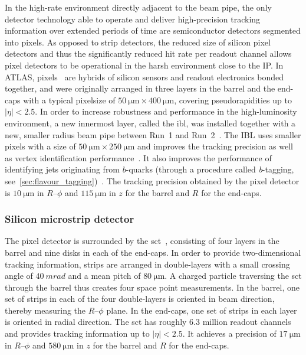 In the high-rate environment directly adjacent to the beam pipe, the only detector technology able to operate and deliver high-precision tracking information over extended periods of time are semiconductor detectors segmented into pixels. As opposed to strip detectors, the reduced size of silicon pixel detectors and thus the significantly reduced hit rate per readout channel allows pixel detectors to be operational in the harsh environment close to the IP.
In ATLAS, pixels~\cite{Aad:2008zzm} are hybrids of silicon sensors and readout electronics bonded together, and were originally arranged in three layers in the barrel and the end-caps with a typical pixelsize of $\SI{50}{\micro\meter}\times \SI{400}{\micro\meter}$, covering pseudorapidities up to $\vert\eta\vert < 2.5$.
In order to increase robustness and performance in the high-luminosity environment, a new innermost layer, called the \gls{ibl}, was installed together with a new, smaller radius beam pipe between Run~1 and Run~2~\cite{Abbott:2018ikt,Capeans:1291633}.
The IBL uses smaller pixels with a size of $\SI{50}{\micro\meter}\times \SI{250}{\micro\meter}$ and improves the tracking precision as well as vertex identification performance~\cite{Capeans:1291633}. It also improves the performance of identifying jets originating from $b$-quarks (through a procedure called \textit{b}-tagging, see~\cref{sec:flavour_tagging})~\cite{Aad:2019aic}. The tracking precision obtained by the pixel detector is $\SI{10}{\micro\meter}$ in $R$--$\phi$ and $\SI{115}{\micro\meter}$ in $z$ for the barrel and $R$ for the end-caps.

\subsubsection{Silicon microstrip detector}

The pixel detector is surrounded by the \gls{sct}~\cite{Aad:2008zzm}, consisting of four layers in the barrel and nine disks in each of the end-caps. In order to provide two-dimensional tracking information, strips are arranged in double-layers with a small crossing angle of $\SI{40}{mrad}$ and a mean pitch of $\SI{80}{\micro\meter}$.
A charged particle traversing the \gls{sct} through the barrel thus creates four space point measurements.
In the barrel, one set of strips in each of the four double-layers is oriented in beam direction, thereby measuring the $R$--$\phi$ plane. In the end-caps, one set of strips in each layer is oriented in radial direction.
The \gls{sct} has roughly $6.3$ million readout channels and provides tracking information up to $\vert\eta\vert <2.5$.
It achieves a precision of $\SI{17}{\micro\meter}$ in $R$--$\phi$ and $\SI{580}{\micro\meter}$ in $z$ for the barrel and $R$ for the end-caps.

